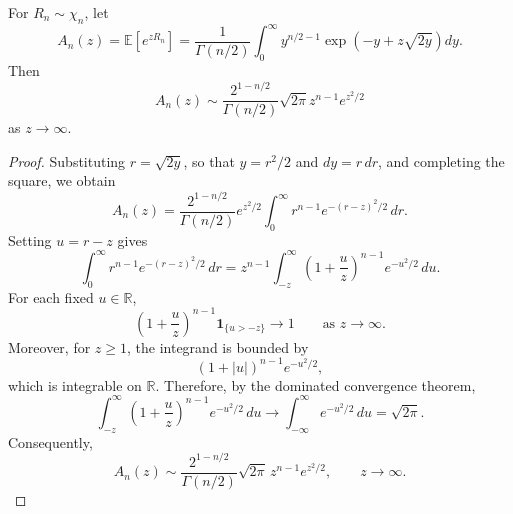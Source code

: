 \begin{lemma}\label{sec:asymp_An}
For $R_n\sim\chi_n$, let
\[
A_n(z)=\mathbb E[e^{z R_n}]=\frac{1}{\Gamma(n/2)}\int_0^\infty y^{n/2-1}\exp(-y+z\sqrt{2y})dy.
\]
Then
$$A_n(z) \sim \frac{2^{1-n/2}}{\Gamma(n/2)} \sqrt{2\pi} z^{n-1} e^{z^2/2}$$ as $z \longrightarrow \infty$.
\end{lemma}











\begin{proof}
Substituting \(r=\sqrt{2y}\), so that \(y=r^2/2\) and
\(dy=r\,dr\), and completing the square, we obtain
\[
A_n(z)
=
\frac{2^{1-n/2}}{\Gamma(n/2)}
e^{z^2/2}
\int_0^\infty
r^{n-1}e^{-(r-z)^2/2}\,dr.
\]
Setting \(u=r-z\) gives
\[
\int_0^\infty
r^{n-1}e^{-(r-z)^2/2}\,dr
=
z^{n-1}
\int_{-z}^\infty
\left(1+\frac{u}{z}\right)^{n-1}
e^{-u^2/2}\,du.
\]
For each fixed \(u\in\mathbb{R}\),
\[
\left(1+\frac{u}{z}\right)^{n-1}
\mathbf{1}_{\{u>-z\}}
\longrightarrow 1
\qquad \text{as } z\to\infty.
\]
Moreover, for \(z\geq 1\), the integrand is bounded by
\[
(1+|u|)^{n-1}e^{-u^2/2},
\]
which is integrable on \(\mathbb{R}\). Therefore, by the dominated
convergence theorem,
\[
\int_{-z}^\infty
\left(1+\frac{u}{z}\right)^{n-1}
e^{-u^2/2}\,du
\longrightarrow
\int_{-\infty}^\infty e^{-u^2/2}\,du
=
\sqrt{2\pi}.
\]
Consequently,
\[
A_n(z)
\sim
\frac{2^{1-n/2}}{\Gamma(n/2)}
\sqrt{2\pi}\,
z^{n-1}e^{z^2/2},
\qquad z\to\infty.
\]
\end{proof} 